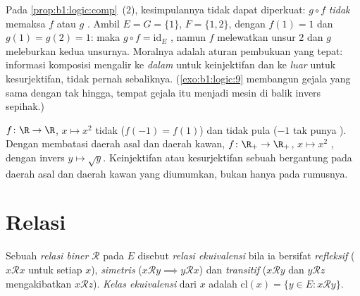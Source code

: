 \begin{example}\label{ex:b1:logic:compsharp}
Pada \cref{prop:b1:logic:comp}~(2), kesimpulannya tidak dapat
diperkuat: $g \circ f$  \emph{tidak} memaksa $f$
 atau $g$ . Ambil $E = G = \{1\}$, $F = \{1,
2\}$, dengan $f(1) = 1$ dan $g(1) = g(2) = 1$: maka $g \circ f =
\mathrm{id}_E$ , namun $f$ melewatkan unsur $2$ dan
$g$ meleburkan kedua unsurnya. Moralnya adalah aturan pembukuan yang
tepat: informasi komposisi mengalir ke  \emph{dalam} untuk
keinjektifan dan ke  \emph{luar} untuk kesurjektifan, tidak
pernah sebaliknya. (\cref{exo:b1:logic:9} membangun gejala yang sama
dengan  tak hingga, tempat gejala itu menjadi mesin di balik
invers sepihak.)
\end{example}

\begin{example}\label{ex:b1:logic:injexamples}
$f \colon \R \to \R$, $x \mapsto x^2$ tidak  ($f(-1) =
f(1)$) dan tidak pula  ($-1$ tak punya ). Dengan
membatasi daerah asal dan daerah kawan, $f \colon \R_+ \to \R_+$,
$x \mapsto x^2$ , dengan invers $y \mapsto \sqrt y$.
Keinjektifan atau kesurjektifan sebuah  bergantung pada daerah
asal dan daerah kawan yang diumumkan, bukan hanya pada rumusnya.
\end{example}

\section{Relasi}

\begin{definition}\label{def:b1:logic:equiv}
Sebuah \emph{relasi biner} $\mathcal{R}$ pada  $E$ disebut
\emph{relasi ekuivalensi} bila ia bersifat
\emph{refleksif} ($x \mathbin{\mathcal{R}} x$ untuk setiap $x$),
\emph{simetris} ($x \mathbin{\mathcal{R}} y \implies y
\mathbin{\mathcal{R}} x$) dan \emph{transitif} ($x
\mathbin{\mathcal{R}} y$ dan $y \mathbin{\mathcal{R}} z$
mengakibatkan $x
\mathbin{\mathcal{R}} z$). \emph{Kelas ekuivalensi} dari $x$ adalah
$\mathrm{cl}(x) = \{y \in E : x \mathbin{\mathcal{R}} y\}$.
\end{definition}

